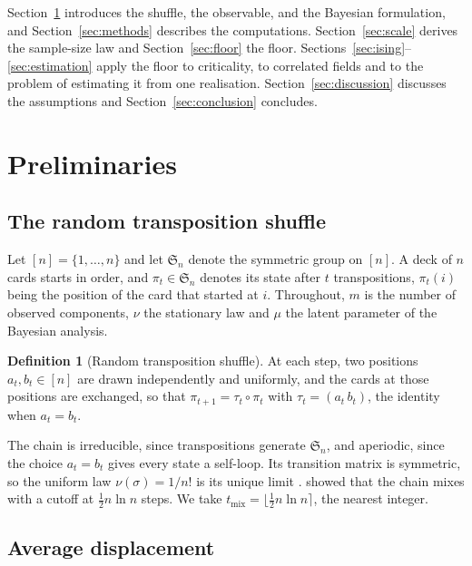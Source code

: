 \documentclass[ba,preprint]{imsart}
\theoremstyle{plain}
\theoremstyle{definition}
\newtheorem{definition}[theorem]{Definition}
\newcommand{\Sym}{\mathfrak{S}}
\begin{document}
Section~\ref{sec:prelim} introduces the shuffle, the observable, and the Bayesian formulation, and Section~\ref{sec:methods} describes the computations. Section~\ref{sec:scale} derives the sample-size law and Section~\ref{sec:floor} the floor. Sections~\ref{sec:ising}--\ref{sec:estimation} apply the floor to criticality, to correlated fields and to the problem of estimating it from one realisation. Section~\ref{sec:discussion} discusses the assumptions and Section~\ref{sec:conclusion} concludes.

\section{Preliminaries}\label{sec:prelim}

\subsection{The random transposition shuffle}

Let $[n]=\{1,\dots,n\}$ and let $\Sym_n$ denote the symmetric group on $[n]$. A deck of $n$ cards starts in order, and $\pi_t\in\Sym_n$ denotes its state after $t$ transpositions, $\pi_t(i)$ being the position of the card that started at $i$. Throughout, $m$ is the number of observed components, $\nu$ the stationary law and $\mu$ the latent parameter of the Bayesian analysis.

\begin{definition}[Random transposition shuffle]\label{def:shuffle}
At each step, two positions $a_t,b_t\in[n]$ are drawn independently and uniformly, and the cards at those positions are exchanged, so that $\pi_{t+1}=\tau_t\circ\pi_t$ with $\tau_t=(a_t\,b_t)$, the identity when $a_t=b_t$.
\end{definition}

The chain is irreducible, since transpositions generate $\Sym_n$, and aperiodic, since the choice $a_t=b_t$ gives every state a self-loop. Its transition matrix is symmetric, so the uniform law $\nu(\sigma)=1/n!$ is its unique limit \citep{LevinPeresWilmer2009}. \citet{DiaconisShahshahani1981} showed that the chain mixes with a cutoff at $\tfrac12 n\ln n$ steps. We take $t_{\mathrm{mix}}=\lfloor\tfrac12 n\ln n\rceil$, the nearest integer.

\subsection{Average displacement}
\end{document}
